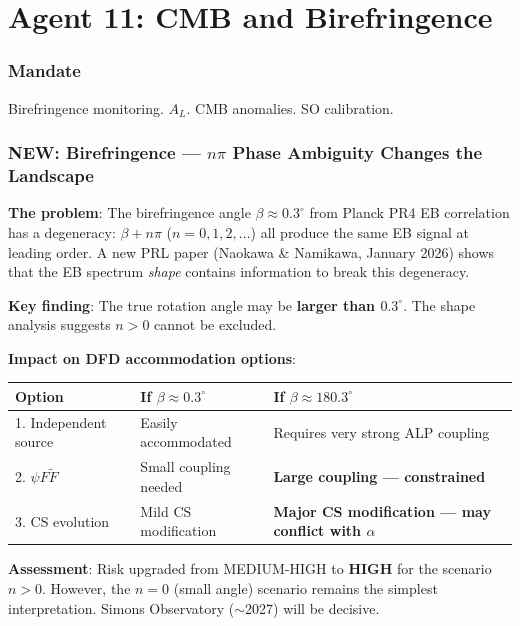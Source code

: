 \documentclass[11pt,a4paper]{article}
\newcommand{\NEW}{\textcolor{dfdblue}{\textbf{NEW}}}
\begin{document}
\part{Agent 11: CMB and Birefringence}
\label{part:agent11}

\section{Mandate}

Birefringence monitoring. $A_L$. CMB anomalies. SO calibration.

\section{\NEW: Birefringence --- $n\pi$ Phase Ambiguity Changes the Landscape}

\begin{tcolorbox}[colback=red!5!white, colframe=red!60!black,
  title={\NEW: PRL 2026 --- $n\pi$ Phase Ambiguity of Cosmic Birefringence}]

\textbf{The problem}: The birefringence angle $\beta \approx 0.3^\circ$ from Planck PR4 EB correlation has a degeneracy: $\beta + n\pi$ ($n = 0, 1, 2, \ldots$) all produce the same EB signal at leading order. A new PRL paper (Naokawa \& Namikawa, January 2026) shows that the EB spectrum \emph{shape} contains information to break this degeneracy.

\textbf{Key finding}: The true rotation angle may be \textbf{larger than $0.3^\circ$}. The shape analysis suggests $n > 0$ cannot be excluded.

\textbf{Impact on DFD accommodation options}:

\begin{center}
\begin{tabular}{lp{4cm}p{4cm}}
\toprule
\textbf{Option} & \textbf{If $\beta \approx 0.3^\circ$} & \textbf{If $\beta \approx 180.3^\circ$} \\
\midrule
1. Independent source & Easily accommodated & Requires very strong ALP coupling \\
2. $\psi F \tilde{F}$ & Small coupling needed & \textbf{Large coupling --- constrained} \\
3. CS evolution & Mild CS modification & \textbf{Major CS modification --- may conflict with $\alpha$} \\
\bottomrule
\end{tabular}
\end{center}

\textbf{Assessment}: Risk upgraded from MEDIUM-HIGH to \textbf{HIGH} for the scenario $n > 0$. However, the $n = 0$ (small angle) scenario remains the simplest interpretation. Simons Observatory ($\sim$2027) will be decisive.
\end{tcolorbox}
\end{document}
